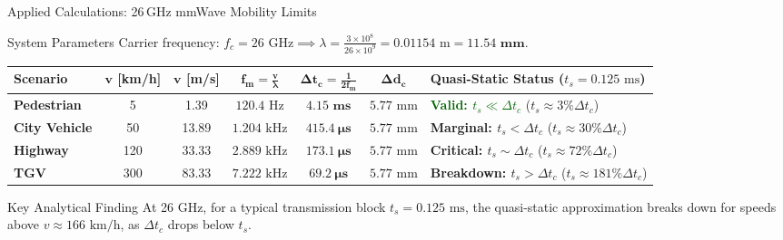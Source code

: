 \documentclass[aspectratio=169, 10pt]{beamer}
\begin{document}
\begin{frame}{Applied Calculations: 26\,GHz mmWave Mobility Limits}
    \begin{block}{System Parameters}
        Carrier frequency: $f_c = 26\text{ GHz} \implies \lambda = \frac{3\times 10^8}{26\times 10^9} = 0.01154\text{ m} = \mathbf{11.54\text{ mm}}$.
    \end{block}

    \begin{table}
        \centering
        \small
        \footnotesize
        \begin{tabular}{@{}lcccccl@{}}
            \toprule
            \textbf{Scenario} & $\bm{v}$ \textbf{[km/h]} & $\bm{v}$ \textbf{[m/s]} & $\bm{f_m = \frac{v}{\lambda}}$ & $\bm{\Delta t_c = \frac{1}{2f_m}}$ & $\bm{\Delta d_c}$ & \textbf{Quasi-Static Status ($t_s = 0.125\text{ ms}$)} \\
            \midrule
            \textbf{Pedestrian}       & 5   & 1.39  & $120.4\text{ Hz}$  & $\mathbf{4.15\text{ ms}}$   & $5.77\text{ mm}$ & \textcolor{darkgreen}{\textbf{Valid: $t_s \ll \Delta t_c$}} ($t_s \approx 3\% \Delta t_c$) \\
            \textbf{City Vehicle}     & 50  & 13.89 & $1.204\text{ kHz}$ & $\mathbf{415.4\ \mu\text{s}}$ & $5.77\text{ mm}$ & \textcolor{amber}{\textbf{Marginal: $t_s < \Delta t_c$}} ($t_s \approx 30\% \Delta t_c$) \\
            \textbf{Highway}    & 120 & 33.33 & $2.889\text{ kHz}$ & $\mathbf{173.1\ \mu\text{s}}$ & $5.77\text{ mm}$ & \textcolor{mathred}{\textbf{Critical: $t_s \sim \Delta t_c$}} ($t_s \approx 72\% \Delta t_c$) \\
            \textbf{TGV} & 300 & 83.33 & $7.222\text{ kHz}$ & $\mathbf{69.2\ \mu\text{s}}$  & $5.77\text{ mm}$ & \textcolor{mathred}{\textbf{Breakdown: $t_s > \Delta t_c$}} ($t_s \approx 181\% \Delta t_c$) \\
            \bottomrule
        \end{tabular}
    \end{table}

    \begin{alertblock}{Key Analytical Finding}
        At 26 GHz, for a typical transmission block $t_s = 0.125\text{ ms}$, the quasi-static approximation breaks down for speeds above $v \approx 166\text{ km/h}$, as $\Delta t_c$ drops below $t_s$.
    \end{alertblock}
\end{frame}
\end{document}
